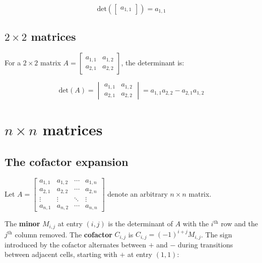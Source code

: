 \documentclass{article}
\begin{document}
\[\text{det}\left(\begin{bmatrix} a_{1,1} \end{bmatrix}\right) = a_{1,1}\]



\subsection*{$2 \times 2$ matrices}

For a \(2 \times 2\) matrix \(A = \begin{bmatrix} a_{1,1} & a_{1,2} \\ a_{2,1} & a_{2,2} \end{bmatrix}\), the determinant is: 

\[\text{det}(A) = \begin{vmatrix} a_{1,1} & a_{1,2} \\ a_{2,1} & a_{2,2} \end{vmatrix} = a_{1,1}a_{2,2} - a_{2,1}a_{1,2}\]




\section*{$n \times n$ matrices}

\subsection*{The cofactor expansion}

Let \(A = \begin{bmatrix} a_{1,1} & a_{1,2} & \cdots & a_{1,n} \\ a_{2,1} & a_{2,2} & \cdots & a_{2,n} \\ \vdots & \vdots & \ddots & \vdots \\ a_{n,1} & a_{n,2} & \cdots & a_{n,n} \end{bmatrix}\) denote an arbitrary \(n \times n\) matrix.

The {\bf minor} \(M_{i,j}\) at entry \((i,j)\) is the determinant of \(A\) with the \(i^{\text{th}}\) row and the \(j^{\text{th}}\) column removed. The {\bf cofactor} \(C_{i,j}\) is \(C_{i,j} = (-1)^{i + j}M_{i,j}\). The sign introduced by the cofactor alternates between \(+\) and \(-\) during transitions between adjacent cells, starting with \(+\) at entry \((1,1)\):
\end{document}
